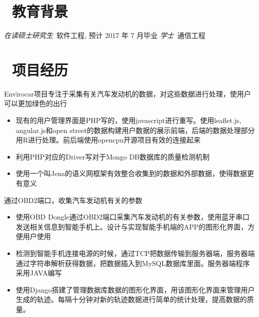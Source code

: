 \documentclass{resume}
\begin{document}


 
\section{\faGraduationCap\  教育背景}
\textit{在读硕士研究生}\ 软件工程, 预计 2017 年 7 月毕业
\textit{学士}\ 通信工程

\section{\faUsers\ 项目经历}
Envirocar项目专注于采集有关汽车发动机的数据，对这些数据进行处理，使用户可以更加绿色的出行
\begin{itemize}
  \item 现有的用户管理界面是PHP写的，使用javascript进行重写。使用leaflet.js, angular.js和open street的数据构建用户数据的展示前端，后端的数据处理部分用R进行处理。前后端使用opencpu开源项目有效的连接起来
  \item 利用PHP对应的Driver写对于Mongo DB数据库的质量检测机制
  \item 使用一个叫Jena的语义网框架有效整合收集到的数据和外部数据，使得数据更有意义
\end{itemize}

\begin{onehalfspacing}
通过OBD2端口，收集汽车发动机有关的参数
\begin{itemize}
  \item 使用OBD Dongle通过OBD2端口采集汽车发动机的有关参数，使用蓝牙串口发送相关信息到智能手机上。设计与实现智能手机端的APP的图形化界面，方便用户使用
  \item 检测到智能手机连接电源的时候，通过TCP把数据传输到服务器端，服务器端通过字符串解析获得数据，把数据插入到MySQL数据库里面。服务器端程序采用JAVA编写
  \item 使用Django搭建了管理数据库数据的图形化界面，用该图形化界面来管理用户生成的轨迹。每隔十分钟对新的轨迹数据进行简单的统计处理，提高数据的质量。
\end{itemize}
\end{onehalfspacing}
\end{document}
